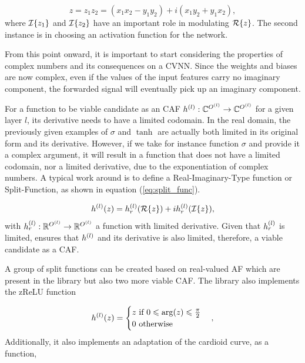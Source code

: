 \begin{equation}
	z = z_1 z_2 = ( x_1 x_2 - y_1 y_2 ) + i( x_1 y_2 + y_1 x_2 ),
\end{equation}
where $ \mathcal{I}\{ z_1 \} $ and $\mathcal{I}\{ z_2 \} $ have an important role in modulating $ \mathcal{R}\{ z \} $. The second instance is in choosing an activation function for the network.

From this point onward, it is important to start considering the properties of complex numbers and its consequences on a \gls{CVNN}. Since the weights and biases are now complex, even if  the values of the input features carry no imaginary component, the forwarded signal will eventually pick up an imaginary component.

For a function to be viable candidate as an \gls{CAF} $ h^{(l)}: \mathbb{C}^{O^{(l)}} \rightarrow \mathbb{C}^{O^{(l)}} $ for a given layer $ l $, its derivative needs to have a limited codomain. In the real domain, the previously given examples of $ \sigma $ and $ \tanh $ are actually both limited in its original form and its derivative. However, if we take for instance function $ \sigma $ and provide it a complex argument, it will result in a function that does not have a limited codomain, nor a limited derivative, due to the exponentiation of complex numbers. A typical work around is to define a Real-Imaginary-Type function or Split-Function, as shown in equation (\ref{eq:split_func}).

\begin{equation}
	h^{(l)}(z) = h^{(l)}_{r}(\mathcal{R}\{ z \}) + i h^{(l)}_{r}(\mathcal{I}\{ z \}),
	\label{eq:split_func}
\end{equation}
with $ h^{(l)}_{r}:  \mathbb{R}^{O^{(l)}} \rightarrow \mathbb{R}^{O^{(l)}} $ a function with limited derivative. Given that $ h^{(l)}_{r} $ is limited, ensures that  $ h^{(l)} $ and its derivative is also limited, therefore, a viable candidate as a \gls{CAF}.

A group of split functions can be created based on real-valued \gls{AF} which are present in the library but also two more viable \gls{CAF}. The library also implements the zReLU function

\begin{equation}
	h^{(l)}(z) = 
	\begin{cases}
		z \ \text{if} \  0 \leqslant \arg(z) \leqslant \frac{\pi}{2} \\
		0 \  \text{otherwise}
	\end{cases},
\end{equation}
Additionally, it also implements an adaptation of the cardioid curve, as a function,

